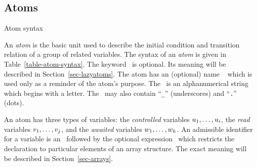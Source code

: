 \subsection{Atoms}

\begin{table}
\caption{Atom syntax}
\label{table-atom-syntax}
\end{table}

An {\em atom\/} is the basic unit used to describe the
initial condition and transition relation of a group of related
variables.  The syntax of an \emph{atom} is given in Table~\ref{table-atom-syntax}.
The keyword \LAZY\ is optional. Its meaning will be described in
Section~\ref{sec-lazyatoms}.  The atom has an (optional) name
\atomname\  which is used only as a reminder of the atom's purpose.
The \ident\ is an alphanumerical string which begins with a letter.
The \ident\ may also contain ``{\tt \_}'' (underscores) and ``{\tt .}'' (dots).

An atom has three types of variables:
the {\em controlled\/} variables $u_1, \ldots, u_i$,
the {\em read\/} variables $v_1, \ldots, v_j$, and
the {\em awaited\/} variables $w_1, \ldots, w_k$.
An admissible identifier for a variable is an \ident\ followed
by the optional expression \adeclare\ which restricts the declaration
to particular elements of an array structure.
The exact meaning will be described in Section~\ref{sec-arrays}.

